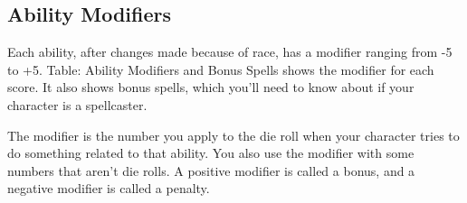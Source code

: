 \documentclass[10pt,a4paper,twocolumn]{d20}
\begin{document}


\subsection{Ability Modifiers}

Each ability, after changes made because of race, has a modifier ranging from -5 to +5. Table: Ability Modifiers and Bonus Spells shows the modifier for each score. It also shows bonus spells, which you’ll need to know about if your character is a spellcaster.

The modifier is the number you apply to the die roll when your character tries to do something related to that ability. You also use the modifier with some numbers that aren’t die rolls. A positive modifier is called a bonus, and a negative modifier is called a penalty.
\end{document}

